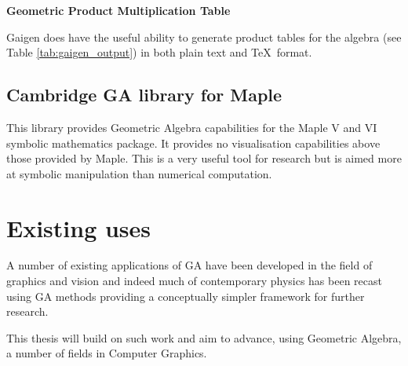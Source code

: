 \begin{table}
\centering
\textbf{Geometric Product Multiplication Table}\\
\rule{0cm}{0.3cm}

\caption{Example \TeX\ output from Gaigen\label{tab:gaigen_output}}
\end{table}

Gaigen does have the useful ability to generate product tables for the algebra
(see Table \ref{tab:gaigen_output}) in both plain text and \TeX\ format. 


\subsection{Cambridge GA library for Maple}

This library\cite{GA:CambridgeGALibrary} provides Geometric Algebra
capabilities for the Maple V and VI symbolic mathematics package. It provides
no visualisation capabilities above those provided by Maple. This is a very
useful tool for research but is aimed more at symbolic manipulation than
numerical computation.

\section{Existing uses}

A number of existing applications of GA have been developed in the
field of graphics and vision\cite{DBLP:conf/giae/WarehamCL04,SahanLasenby} and
indeed much of contemporary physics has been recast using GA 
methods\cite{DoranLasenby} providing a conceptually simpler
framework for further research.

This thesis will build on such work and aim to advance, using Geometric
Algebra, a number of fields in Computer Graphics.

